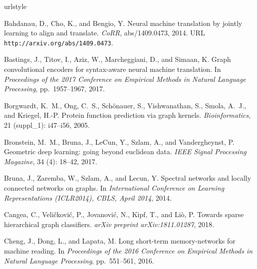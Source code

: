 \documentclass{article}
\begin{document}
 \begin{thebibliography}{57}
\providecommand{\natexlab}[1]{#1}
\providecommand{\url}[1]{\texttt{#1}}
\expandafter\ifx\csname urlstyle\endcsname\relax
  \providecommand{\doi}[1]{doi: #1}\else
  \providecommand{\doi}{doi: \begingroup \urlstyle{rm}\Url}\fi

Bahdanau, D., Cho, K., and Bengio, Y.
\newblock Neural machine translation by jointly learning to align and
  translate.
\newblock \emph{CoRR}, abs/1409.0473, 2014.
\newblock URL \url{http://arxiv.org/abs/1409.0473}.

Bastings, J., Titov, I., Aziz, W., Marcheggiani, D., and Simaan, K.
\newblock Graph convolutional encoders for syntax-aware neural machine
  translation.
\newblock In \emph{Proceedings of the 2017 Conference on Empirical Methods in
  Natural Language Processing}, pp.\  1957--1967, 2017.

Borgwardt, K.~M., Ong, C.~S., Sch{\"o}nauer, S., Vishwanathan, S., Smola,
  A.~J., and Kriegel, H.-P.
\newblock Protein function prediction via graph kernels.
\newblock \emph{Bioinformatics}, 21 (suppl\_1): i47--i56,
  2005.

Bronstein, M.~M., Bruna, J., LeCun, Y., Szlam, A., and Vandergheynst, P.
\newblock Geometric deep learning: going beyond euclidean data.
\newblock \emph{IEEE Signal Processing Magazine}, 34 (4):
  18--42, 2017.

Bruna, J., Zaremba, W., Szlam, A., and Lecun, Y.
\newblock Spectral networks and locally connected networks on graphs.
\newblock In \emph{International Conference on Learning Representations
  (ICLR2014), CBLS, April 2014}, 2014.

Cangea, C., Veli{\v{c}}kovi{\'c}, P., Jovanovi{\'c}, N., Kipf, T., and Li{\`o},
  P.
\newblock Towards sparse hierarchical graph classifiers.
\newblock \emph{arXiv preprint arXiv:1811.01287}, 2018.

Cheng, J., Dong, L., and Lapata, M.
\newblock Long short-term memory-networks for machine reading.
\newblock In \emph{Proceedings of the 2016 Conference on Empirical Methods in
  Natural Language Processing}, pp.\  551--561, 2016.


\end{thebibliography}
\end{document}
